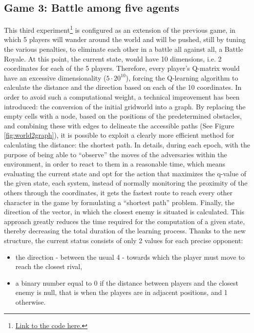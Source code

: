 \subsection{Game 3: Battle among five agents}
This third experiment\footnote{\href{https://github.com/moiraghif/DragonHunting/tree/master/Duel_2}{Link to the code here.}} is configured as an extension of the previous game, in which 5 players will wander around the world and will be pushed, still by tuning the various penalties, to eliminate each other in a battle all against all, a Battle Royale. 
At this point, the current state, would have 10 dimensions, i.e. 2 coordinates for each of the 5 players. Therefore, every player's Q-matrix would have an excessive dimensionality ($5\cdot20^{10}$), forcing the Q-learning algorithm to calculate the distance and the direction based on each of the 10 coordinates. 
In order to avoid such a computational weight, a technical improvement has been introduced: the conversion of the initial gridworld into a graph. 
By replacing the empty cells with a node, based on the positions of the predetermined obstacles, and combining these with edges to delineate the accessible paths (See Figure \ref{fig:world2graph}), it is possible to exploit a clearly more efficient method for calculating the distance: the shortest path. 
In details, during each epoch, with the purpose of being able to ``observe'' the moves of the adversaries within the environment, in order to react to them in a reasonable time, which means evaluating the current state and opt for the action that maximizes the q-value of the given state, each system, instead of normally monitoring the proximity of the others through the coordinates, it gets the fastest route to reach every other character in the game by formulating a ``shortest path'' problem. 
Finally, the direction of the vector, in which the closest enemy is situated is calculated. 
This approach greatly reduces the time required for the computation of a given state, thereby decreasing the total duration of the learning process. Thanks to the new structure, the current status consists of only 2 values for each precise opponent:
\begin{itemize}[noitemsep, topsep=0ex]
  \item the direction - between the usual 4 - towards which the player must move to reach the closest rival,
  \item a binary number equal to 0 if the distance between players and the closest enemy is null, that is when the players are in adjacent positions, and 1 otherwise.
\end{itemize}

